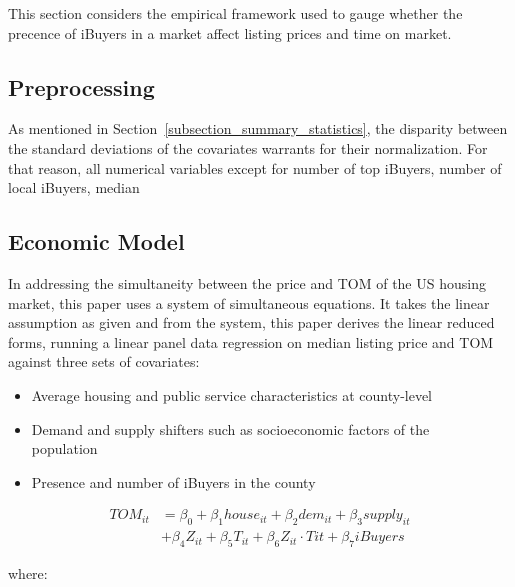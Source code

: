 This section considers the empirical framework used to gauge whether the precence of iBuyers in a market affect listing prices and time on market. 

\subsection{Preprocessing}
As mentioned in Section~\ref{subsection_summary_statistics}, the disparity between the standard deviations of the covariates warrants for their normalization. For that reason, all numerical variables except for number of top iBuyers, number of local iBuyers, median

\subsection{Economic Model}

In addressing the simultaneity between the price and TOM of the US housing market, this paper uses a system of simultaneous equations. It takes the linear assumption as given and from the system, this paper derives the linear reduced forms, running a linear panel data regression on median listing price and TOM against three sets of covariates: 

\begin{itemize}

    \item  Average housing and public service characteristics at county-level  

    \item  Demand and supply shifters such as socioeconomic factors of the population  

    \item  Presence and number of iBuyers in the county 

\end{itemize}

\begin{align}
    TOM_{it} &= \beta_{0} + \beta_1 house_{it} + \beta_2 dem_{it} + \beta_3 supply_{it} \\
              &+ \beta_4 Z_{it} + \beta_5 T_{it} + \beta_6 Z_{it} \cdot Tit + \beta_7 iBuyers 
\end{align}

\noindent where:

